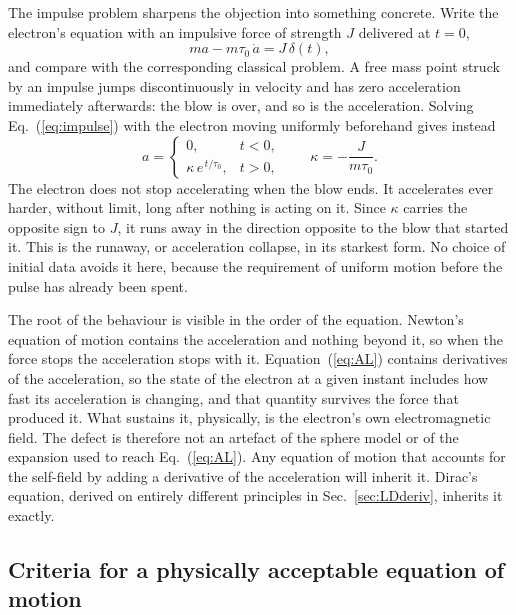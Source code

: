 \documentclass[preprint]{aastex701}
\newcommand{\taunought}{\tau_0}
\begin{document}
The impulse problem sharpens the objection into something concrete. Write the
electron's equation with an impulsive force of strength $J$ delivered at $t=0$,
\begin{equation}
ma - m\taunought\,\dot a = J\,\delta(t),
\label{eq:impulse}
\end{equation}
and compare with the corresponding classical problem. A free mass point struck
by an impulse jumps discontinuously in velocity and has zero acceleration
immediately afterwards: the blow is over, and so is the acceleration. Solving
Eq.~(\ref{eq:impulse}) with the electron moving uniformly beforehand gives
instead
\begin{equation}
a =
\begin{cases}
0, & t<0,\\[2pt]
\kappa\, e^{\,t/\taunought}, & t>0,
\end{cases}
\qquad \kappa = -\frac{J}{m\taunought}.
\label{eq:impulsesol}
\end{equation}
The electron does not stop accelerating when the blow ends. It accelerates ever
harder, without limit, long after nothing is acting on it. Since $\kappa$
carries the opposite sign to $J$, it runs away in the direction opposite to the
blow that started it. This is the runaway, or acceleration collapse, in its
starkest form. No choice of initial data avoids it here, because the requirement
of uniform motion before the pulse has already been spent.

The root of the behaviour is visible in the order of the equation. Newton's
equation of motion contains the acceleration and nothing beyond it, so when the
force stops the acceleration stops with it. Equation~(\ref{eq:AL}) contains
derivatives of the acceleration, so the state of the electron at a given instant
includes how fast its acceleration is changing, and that quantity survives the
force that produced it. What sustains it, physically, is the electron's own
electromagnetic field. The defect is therefore not an artefact of the sphere
model or of the expansion used to reach Eq.~(\ref{eq:AL}). Any equation of
motion that accounts for the self-field by adding a derivative of the
acceleration will inherit it. Dirac's equation, derived on entirely different
principles in Sec.~\ref{sec:LDderiv}, inherits it exactly.

\subsection{Criteria for a physically acceptable equation of motion}
\label{sec:criteria}
\end{document}

